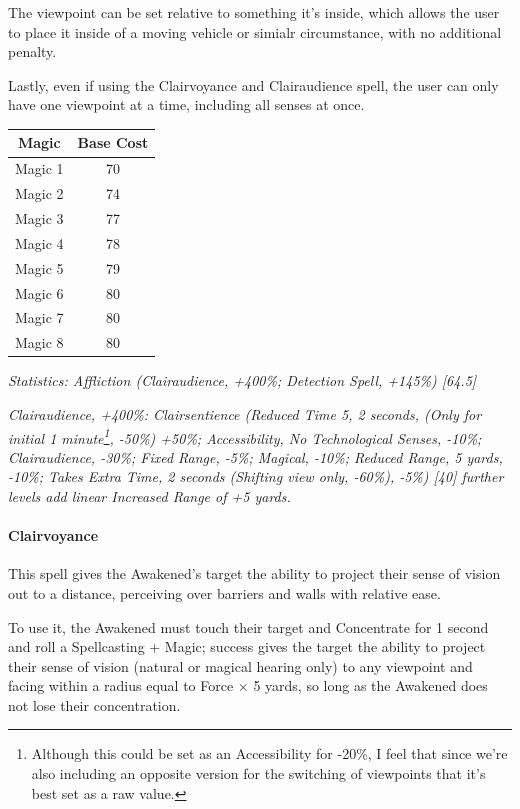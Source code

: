 \begin{multicols*}{3}
	The viewpoint can be set relative to something it's inside, which allows the user to place it inside of a moving vehicle or simialr circumstance, with no additional penalty.
	
	Lastly, even if using the Clairvoyance and Clairaudience spell, the user can only have one viewpoint at a time, including all senses at once.
	
	\begin{center}
		\begin{tabular}{|c|c|}
			\hline
			Magic & Base Cost \\
			\hline
			\hline
			Magic 1 & 70 \\
			Magic 2 & 74 \\
			Magic 3 & 77 \\
			Magic 4 & 78 \\
			Magic 5 & 79 \\
			Magic 6 & 80 \\
			Magic 7 & 80 \\
			Magic 8 & 80 \\
			\hline
		\end{tabular}
	\end{center}
	
	\textcolor{OliveGreen}{\textit{ Statistics: Affliction (Clairaudience, +400\%; Detection Spell, +145\%) [64.5]}}
	
	\textcolor{OliveGreen}{\textit{Clairaudience, +400\%: Clairsentience (Reduced Time 5, 2 seconds, (Only for initial 1 minute\footnote{Although this could be set as an Accessibility for -20\%, I feel that since we're also including an opposite version for the switching of viewpoints that it's best set as a raw value.}, -50\%) +50\%; Accessibility, No Technological Senses, -10\%; Clairaudience, -30\%; Fixed Range, -5\%; Magical, -10\%; Reduced Range, 5 yards, -10\%; Takes Extra Time, 2 seconds (Shifting view only, -60\%), -5\%) [40] further levels add linear Increased Range of +5 yards.}}
	
	\paragraph{Clairvoyance}
		
	This spell gives the Awakened's target the ability to project their sense of vision out to a distance, perceiving over barriers and walls with relative ease.
	
	To use it, the Awakened must touch their target and Concentrate for 1 second and roll a Spellcasting + Magic; success gives the target the ability to project their sense of vision (natural or magical hearing only) to any viewpoint and facing within a radius equal to Force $\times$ 5 yards, so long as the Awakened does not lose their concentration. 
	

\end{multicols*}
